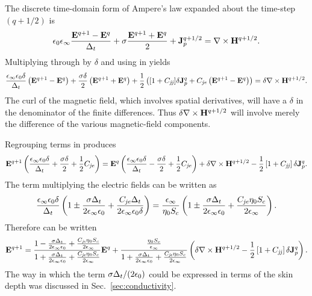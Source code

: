 The discrete time-domain form of Ampere's law expanded about the
time-step $(q+1/2)$ is
\begin{equation}
 \epsilon_0\epsilon_\infty \frac{\mathbf{E}^{q+1}-\mathbf{E}^q}{\Delta_t}
 +\sigma\frac{\mathbf{E}^{q+1}+\mathbf{E}^q}{2}+\mathbf{J}_p^{q+1/2} =
	\nabla\times\mathbf{H}^{q+1/2}.
 \label{eq:ampereDiscrete}
\end{equation}
Multiplying through by $\delta$ and using  in 
 yields
\begin{equation}
 \frac{\epsilon_\infty\epsilon_0\delta}{\Delta_t} 
 \left(\mathbf{E}^{q+1}-\mathbf{E}^q\right)
 +\frac{\sigma\delta}{2}\left(\mathbf{E}^{q+1}+\mathbf{E}^q\right)
 + \frac{1}{2}\left([1+C_{\mathit{jj}}]\delta\mathbf{J}_p^q +
    C_{\mathit{je}}\left(\mathbf{E}^{q+1}-\mathbf{E}^q\right)\right)=
	\delta\nabla\times\mathbf{H}^{q+1/2}.
 \label{eq:ampereDiscreteDebyeI}
\end{equation}
The curl of the magnetic field, which involves spatial derivatives,
will have a $\delta$ in the denominator of the finite differences.
Thus $\delta\nabla\times\mathbf{H}^{q+1/2}$ will involve merely the
difference of the various magnetic-field components.

Regrouping terms in  produces
\begin{equation}
 \mathbf{E}^{q+1}\left(\frac{\epsilon_\infty\epsilon_0\delta}{\Delta_t} 
                   + \frac{\sigma\delta}{2}
                   + \frac{1}{2}C_{\mathit{je}}\right)
 =
 \mathbf{E}^q\left(\frac{\epsilon_\infty\epsilon_0\delta}{\Delta_t} 
                   - \frac{\sigma\delta}{2}
                   + \frac{1}{2}C_{\mathit{je}}\right)
 +\delta\nabla\times\mathbf{H}^{q+1/2} -
 \frac{1}{2}\left[1+C_{\mathit{jj}}\right]\delta\mathbf{J}_p^q.
 \label{eq:eUpdateDebye}
\end{equation}
The term multiplying the electric fields can be written as
\begin{equation}
  \frac{\epsilon_\infty\epsilon_0\delta}{\Delta_t}\left(1
                   \pm \frac{\sigma\Delta_t}{2\epsilon_\infty\epsilon_0}
                   + \frac{C_{\mathit{je}}\Delta_t}{2\epsilon_\infty\epsilon_0\delta}\right)
  =
  \frac{\epsilon_\infty}{\eta_0 S_c}\left(1
                   \pm \frac{\sigma\Delta_t}{2\epsilon_\infty\epsilon_0}
                   + \frac{C_{\mathit{je}}\eta_0 S_c}{2\epsilon_\infty}\right).
\end{equation}
Therefore  can be written
\begin{equation}
 \mathbf{E}^{q+1}=
  \frac{1 - \frac{\sigma\Delta_t}{2\epsilon_\infty\epsilon_0}
          + \frac{C_{\mathit{je}}\eta_0 S_c}{2\epsilon_\infty}}
       {1 + \frac{\sigma\Delta_t}{2\epsilon_\infty\epsilon_0}
          + \frac{C_{\mathit{je}}\eta_0 S_c}{2\epsilon_\infty}}
 \mathbf{E}^q
 +  \frac{\frac{\eta_0 S_c}{\epsilon_\infty}}{1
                   + \frac{\sigma\Delta_t}{2\epsilon_\infty\epsilon_0}
                   + \frac{C_{\mathit{je}}\eta_0 S_c}{2\epsilon_\infty}}
\left(\delta\nabla\times\mathbf{H}^{q+1/2} -
 \frac{1}{2}\left[1+C_{\mathit{jj}}\right]\delta\mathbf{J}_p^q\right).
 \label{eq:eUpdateDebyeI}
\end{equation}
The way in which the term $\sigma\Delta_t/(2\epsilon_0)$ could be
expressed in terms of the skin depth was discussed in Sec.\
\ref{sec:conductivity}.

